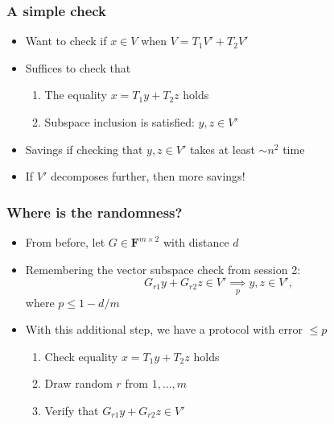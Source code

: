 \documentclass{beamer}
\newcommand{\field}{\mathbf{F}}
\newcommand{\impliesn}[1]{\underset{#1}{\implies}}
\newcommand{\impliesp}{\impliesn{p}}
\begin{document}
    \begin{frame}
        \frametitle{A simple check}
        \begin{itemize}\itemsep=12pt
            \item Want to check if $x \in V$ when $V = T_1V' + T_2V'$
            \pause
            \item Suffices to check that
            \begin{enumerate}\itemsep=8pt
                \item The equality $x = T_1y+T_2z$ holds
                \item Subspace inclusion is satisfied: $y, z \in V'$
            \end{enumerate}
            \pause
            \item Savings if checking that $y, z \in V'$ takes at least $\sim n^2$ time
            \pause
            \item If $V'$ decomposes further, then more savings!
        \end{itemize}
	\end{frame}

    \begin{frame}
        \frametitle{Where is the randomness?}
        \begin{itemize}\itemsep=12pt
            \item From before, let $G \in \field^{m \times 2}$ with distance $d$
            \item Remembering the vector subspace check from session 2:
            \[
                G_{r1}y + G_{r2}z \in V' \impliesp y, z \in V',
            \]
            where $p \le 1-d/m$
            \item With this additional step, we have a protocol with error $\le p$
            \begin{enumerate}\itemsep=8pt
                \item Check equality $x = T_1y+T_2z$ holds
                \item Draw random $r$ from $1, \dots, m$
                \item Verify that $G_{r1}y + G_{r2}z \in V'$
            \end{enumerate}
        \end{itemize}
	\end{frame}
\end{document}
